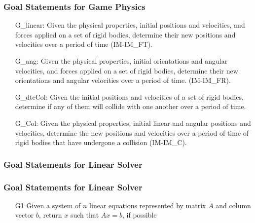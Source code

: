 \documentclass[t,12pt,numbers,fleqn]{beamer}
\begin{document}
\begin{frame}
\frametitle{Goal Statements for Game Physics}

\begin{itemize}
	
\item[G\_linear:] Given the physical properties, initial positions and
  velocities, and forces applied on a set of rigid bodies, determine their new
  positions and velocities over a period of time (IM-IM\_FT).

\item[G\_ang:] Given the physical properties, initial orientations and
  angular velocities, and forces applied on a set of rigid bodies, determine
  their new orientations and angular velocities over a period of
  time. (IM-IM\_FR).

\item[G\_dtcCol:] Given the initial positions and velocities of a set
  of rigid bodies, determine if any of them will collide with one another over a
  period of time.

\item[G\_Col:] Given the physical properties, initial linear and angular
  positions and velocities, determine the new positions and velocities over a
  period of time of rigid bodies that have undergone a collision (IM-IM\_C).

\end{itemize}

\end{frame}


\begin{frame}
\frametitle{Goal Statements for Linear Solver}


\end{frame}


\begin{frame}
\frametitle{Goal Statements for Linear Solver}

\begin{itemize}
	
\item[G1] Given a system of $n$ linear equations represented by matrix $A$ and
  column vector $b$, return $x$ such that $Ax = b$, if possible

\end{itemize}

\end{frame}
\end{document}
